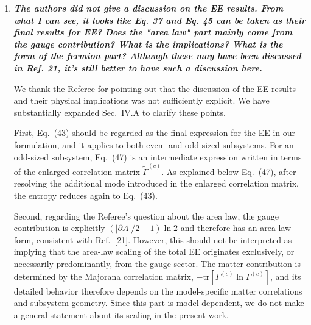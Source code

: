 \documentclass[12pt]{article}
\begin{document}
\begin{enumerate}
    We thank the Referee for pointing out that this step requires further clarification.
    We have modified the paragraphs at the end of Sec.~IV.A (marked in red). 
    In the paragraph discussing the gauge contribution to the entanglement entropy, we emphasize that the term proportional to $\ln 2$ arises from the mismatch between the Hilbert space dimensions. 
    Such a term was later converted into the area-law formula using identity (38).



    \item \textbf{\textit{The authors did not give a discussion on the EE results. From what I can see, it looks like Eq. 37 and Eq. 45 can be taken as their final results for EE? Does the "area law" part mainly come from the gauge contribution? What is the implications? What is the form of the fermion part? Although these may have been discussed in Ref. 21, it's still better to have such a discussion here.}}

    We thank the Referee for pointing out that the discussion of the EE results and their physical implications was not sufficiently explicit. 
    We have substantially expanded Sec.~IV.A to clarify these points.

    First, Eq.~(43) should be regarded as the final expression for the EE in our formulation, and it applies to both even- and odd-sized subsystems. 
    For an odd-sized subsystem, Eq.~(47) is an intermediate expression written in terms of the enlarged correlation matrix $\tilde{\Gamma}^{(c)}$. 
    As explained below Eq.~(47), after resolving the additional mode introduced in the enlarged correlation matrix, the entropy reduces again to Eq.~(43).

    Second, regarding the Referee's question about the area law, the gauge contribution is explicitly $(|\partial A|/2-1)\ln 2$ and therefore has an area-law form, consistent with Ref.~[21]. 
    However, this should not be interpreted as implying that the area-law scaling of the total EE originates exclusively, or necessarily predominantly, from the gauge sector.
    The matter contribution is determined by the Majorana correlation matrix, $-\text{tr}[\Gamma^{(c)}\ln\Gamma^{(c)}]$, and its detailed behavior therefore depends on the model-specific matter correlations and subsystem geometry.
    Since this part is model-dependent, we do not make a general statement about its scaling in the present work.


\end{enumerate}
\end{document}
